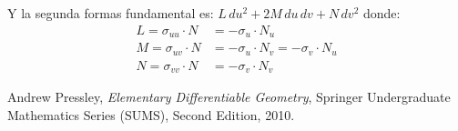 \documentclass{article}
\numberwithin{equation}{section}
\begin{document}
Y  la segunda formas fundamental es: $L\,du^2 + 2M\,du\,dv + N\,dv^2$ donde:
\begin{subequations}
\begin{align}
 L = \sigma_{uu} \cdot N &= -\sigma_u\cdot N_u \\
 M = \sigma_{uv} \cdot N &= -\sigma_u\cdot N_v = -\sigma_v\cdot N_u\\
    N = \sigma_{vv} \cdot N &= -\sigma_v\cdot N_v 
\end{align}
\end{subequations}

\begin{thebibliography}{9}
Andrew Pressley,
\emph{Elementary Differentiable Geometry},
Springer Undergraduate Mathematics Series (SUMS),
Second Edition, 
2010.

\end{thebibliography}
\end{document}
